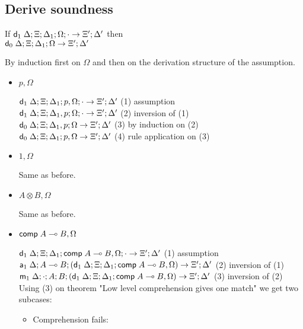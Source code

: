 \documentclass[9pt]{article}
\begin{document}
\subsection{Derive soundness}

If $\mathsf{d}_1 \; \Delta; \Xi; \Delta_1; \Omega; \cdot \rightarrow \Xi'; \Delta'$ then \\
$\mathsf{d}_0 \; \Delta; \Xi; \Delta_1; \Omega \rightarrow \Xi'; \Delta'$


By induction first on $\Omega$ and then on the derivation structure of the assumption.

\begin{itemize}
\item $p, \Omega$

$\mathsf{d}_1 \; \Delta; \Xi; \Delta_1; p, \Omega; \cdot \rightarrow \Xi'; \Delta'$ \hfill (1) assumption \\
$\mathsf{d}_1 \; \Delta; \Xi; \Delta_1, p; \Omega; \cdot \rightarrow \Xi'; \Delta'$ \hfill (2) inversion of (1) \\
$\mathsf{d}_0 \; \Delta; \Xi; \Delta_1, p; \Omega \rightarrow \Xi'; \Delta'$ \hfill (3) by induction on (2) \\
$\mathsf{d}_0 \; \Delta; \Xi; \Delta_1; p, \Omega \rightarrow \Xi'; \Delta'$ \hfill (4) rule application on (3) \\

\item $1, \Omega$

Same as before.

\item $A \otimes B, \Omega$

Same as before.

\item $\mathsf{comp} \; A \multimap B, \Omega$

$\mathsf{d}_1 \; \Delta; \Xi; \Delta_1; \mathsf{comp} \; A \multimap B, \Omega; \cdot \rightarrow \Xi'; \Delta'$ \hfill (1) assumption \\
$\mathsf{a}_1 \; \Delta; A \multimap B; (\mathsf{d}_1 \; \Delta; \Xi; \Delta_1; \mathsf{comp} \; A \multimap B, \Omega) \rightarrow \Xi'; \Delta'$ \hfill (2) inversion of (1) \\
$\mathsf{m}_1 \; \Delta; \cdot; A; B ; (\mathsf{d}_1 \; \Delta; \Xi; \Delta_1; \mathsf{comp} \; A \multimap B, \Omega) \rightarrow \Xi'; \Delta'$ \hfill (3) inversion of (2) \\
Using (3) on theorem "Low level comprehension gives one match" we get two subcases:

\begin{itemize}
\item Comprehension fails:


\end{itemize}
\end{itemize}
\end{document}
